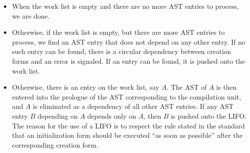 \begin{itemize}
\item When the work list is empty and there are no more AST entries to
  process, we are done.
\item Otherwise, if the work list is empty, but there are more AST
  entries to process, we find an AST entry that does not depend on any
  other entry.  If no such entry can be found, there is a circular
  dependency between creation forms and an error is signaled.  If an
  entry can be found, it is pushed onto the work list.
\item Otherwise, there is an entry on the work list, say $A$.  The AST
  of $A$ is then entered into the prologue of the AST corresponding to
  the compilation unit, and $A$ is eliminated as a dependency of all
  other AST entries. If any AST entry $B$ depending on $A$ depends
  only on $A$, then $B$ is pushed onto the LIFO.  The reason for the
  use of a LIFO is to respect the rule stated in the standard that an
  initialization form should be executed ``as soon as possible'' after
  the corresponding creation form.
\end{itemize}

